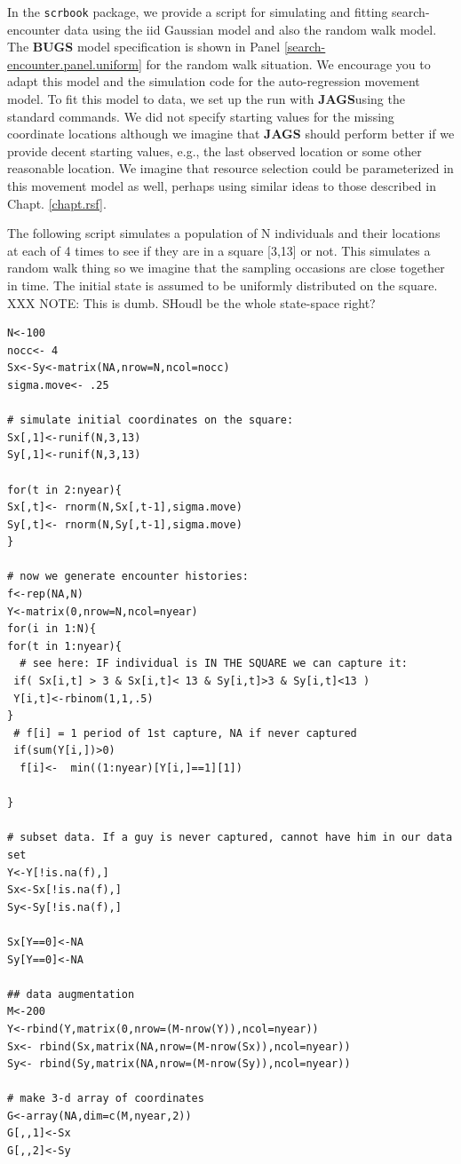 In the \mbox{\tt scrbook} package, we provide a script for simulating
and fitting search-encounter data using the iid Gaussian model and
also the random walk model.  The {\bf BUGS} model specification is
shown in Panel \ref{search-encounter.panel.uniform} for the random
walk situation. We encourage you to adapt this model and the
simulation code for the auto-regression movement model.  To fit this
model to data, we set up the run with {\bf JAGS}using the standard
commands. We did not specify starting values for the missing
coordinate locations although we imagine that {\bf JAGS} should
perform better if we provide decent starting values, e.g., the last
observed location or some other reasonable location.  We imagine that
resource selection could be parameterized in this movement model as
well, perhaps using similar ideas to those described in
Chapt. \ref{chapt.rsf}.

The following script simulates a population of N individuals and their
locations at each of 4 times to see if they are in a square [3,13] or
not.
This simulates a random walk thing so we imagine that the sampling
occasions are close together in time.  The initial state is assumed to
be uniformly distributed on the square. 
XXX NOTE: This is dumb. SHoudl be the whole state-space right?

\begin{verbatim}
N<-100
nocc<- 4
Sx<-Sy<-matrix(NA,nrow=N,ncol=nocc)
sigma.move<- .25

# simulate initial coordinates on the square:
Sx[,1]<-runif(N,3,13)
Sy[,1]<-runif(N,3,13)

for(t in 2:nyear){
Sx[,t]<- rnorm(N,Sx[,t-1],sigma.move)
Sy[,t]<- rnorm(N,Sy[,t-1],sigma.move)
}

# now we generate encounter histories:
f<-rep(NA,N)
Y<-matrix(0,nrow=N,ncol=nyear)
for(i in 1:N){
for(t in 1:nyear){
  # see here: IF individual is IN THE SQUARE we can capture it:
 if( Sx[i,t] > 3 & Sx[i,t]< 13 & Sy[i,t]>3 & Sy[i,t]<13 )
 Y[i,t]<-rbinom(1,1,.5)
}
 # f[i] = 1 period of 1st capture, NA if never captured
 if(sum(Y[i,])>0)
  f[i]<-  min((1:nyear)[Y[i,]==1][1])

}

# subset data. If a guy is never captured, cannot have him in our data set
Y<-Y[!is.na(f),]
Sx<-Sx[!is.na(f),]
Sy<-Sy[!is.na(f),]

Sx[Y==0]<-NA
Sy[Y==0]<-NA

## data augmentation
M<-200
Y<-rbind(Y,matrix(0,nrow=(M-nrow(Y)),ncol=nyear))
Sx<- rbind(Sx,matrix(NA,nrow=(M-nrow(Sx)),ncol=nyear))
Sy<- rbind(Sy,matrix(NA,nrow=(M-nrow(Sy)),ncol=nyear))

# make 3-d array of coordinates
G<-array(NA,dim=c(M,nyear,2))
G[,,1]<-Sx
G[,,2]<-Sy
\end{verbatim}


